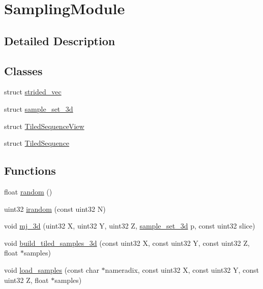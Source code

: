 \hypertarget{group___sampling_module}{}\section{Sampling\+Module}
\label{group___sampling_module}


\subsection{Detailed Description}
\subsection*{Classes}
\begin{DoxyCompactItemize}
\item 
struct \hyperlink{structstrided__vec}{strided\+\_\+vec}
\item 
struct \hyperlink{structsample__set__3d}{sample\+\_\+set\+\_\+3d}
\item 
struct \hyperlink{struct_tiled_sequence_view}{Tiled\+Sequence\+View}
\item 
struct \hyperlink{struct_tiled_sequence}{Tiled\+Sequence}
\end{DoxyCompactItemize}
\subsection*{Functions}
\begin{DoxyCompactItemize}
\item 
float \hyperlink{group___sampling_module_gaec17bbbfd36295353081b7b4480d933d}{random} ()
\item 
uint32 \hyperlink{group___sampling_module_ga60d3362a11c556fce4eaf7e9989b119a}{irandom} (const uint32 N)
\item 
void \hyperlink{group___sampling_module_ga74a2d233874c14c777b4a1f7de6dcad7}{mj\+\_\+3d} (uint32 X, uint32 Y, uint32 Z, \hyperlink{structsample__set__3d}{sample\+\_\+set\+\_\+3d} p, const uint32 slice)
\item 
void \hyperlink{group___sampling_module_gaab55fcc60947be784a6023b83b155ad1}{build\+\_\+tiled\+\_\+samples\+\_\+3d} (const uint32 X, const uint32 Y, const uint32 Z, float $\ast$samples)
\item 
void \hyperlink{group___sampling_module_gac2c10d84fc3ae4eab94ebad2c1e72e99}{load\+\_\+samples} (const char $\ast$nameradix, const uint32 X, const uint32 Y, const uint32 Z, float $\ast$samples)
\end{DoxyCompactItemize}


